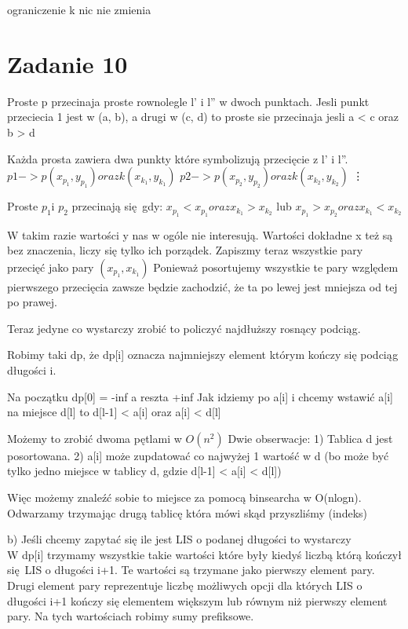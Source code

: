 \documentclass[12pt]{article}
\begin{document}
ograniczenie k nic nie zmienia

\section{Zadanie 10}

Proste p przecinaja proste rownolegle l' i l'' w dwoch punktach. Jesli punkt przeciecia 1 jest w (a, b), a drugi w (c, d) to proste sie przecinaja jesli a < c oraz b > d


Każda prosta zawiera dwa punkty które symbolizują przecięcie z l' i l''.
$p1 -> p(x_{p_1}, y_{p_1}) oraz k(x_{k_1}, y_{k_1})$
$p2 -> p(x_{p_2}, y_{p_2}) oraz k(x_{k_2}, y_{k_2})$
\vdots

Proste $p_1 $i $p_2$ przecinają się gdy:
$x_{p_1} < x_{p_1} oraz x_{k_1} > x_{k_2}$
lub 
$x_{p_1} > x_{p_2} oraz x_{k_1} < x_{k_2}$

W takim razie wartości y nas w ogóle nie interesują. 
Wartości dokładne x też są bez znaczenia, liczy się tylko ich porządek. 
Zapiszmy teraz wszystkie pary przecięć jako pary $(x_{p_1}, x_{k_1}) $
Ponieważ posortujemy wszystkie te pary względem pierwszego przecięcia zawsze będzie zachodzić, że ta po lewej jest mniejsza od tej po prawej. 

Teraz jedyne co wystarczy zrobić to policzyć najdłuższy rosnący podciąg.

Robimy taki dp, że dp[i] oznacza najmniejszy element którym kończy się podciąg długości i.

Na początku dp[0] = -inf a reszta +inf 
Jak idziemy po a[i] i chcemy wstawić a[i] na miejsce d[l] to d[l-1] < a[i] oraz a[i] < d[l]

Możemy to zrobić dwoma pętlami w $O(n^2)$
Dwie obserwacje:
1) Tablica d jest posortowana. 
2) a[i] może zupdatować co najwyżej 1 wartość w d (bo może być tylko jedno miejsce w tablicy d, gdzie d[l-1] < a[i] < d[l])

Więc możemy znaleźć sobie to miejsce za pomocą binsearcha w O(nlogn).
Odwarzamy trzymając drugą tablicę która mówi skąd przyszliśmy (indeks)


b) Jeśli chcemy zapytać się ile jest LIS o podanej długości to wystarczy \\

W dp[i] trzymamy wszystkie takie wartości które były kiedyś liczbą którą kończył się LIS o długości i+1. Te wartości są trzymane jako pierwszy element pary. Drugi element pary reprezentuje liczbę możliwych opcji dla których LIS o długości i+1 kończy się elementem większym lub równym niż pierwszy element pary. Na tych wartościach robimy sumy prefiksowe.\\
\end{document}
